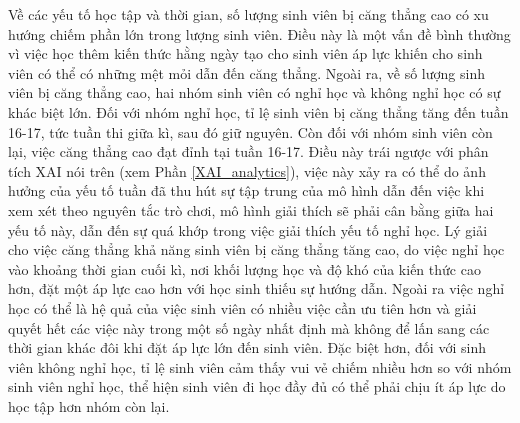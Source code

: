 Về các yếu tố học tập và thời gian, số lượng sinh viên bị căng thẳng cao có xu hướng chiếm phần lớn trong lượng sinh viên. Điều này là một vấn đề bình thường vì việc học thêm kiến thức hằng ngày tạo cho sinh viên áp lực khiến cho sinh viên có thể có những mệt mỏi dẫn đến căng thẳng. Ngoài ra, về số lượng sinh viên bị căng thẳng cao, hai nhóm sinh viên có nghỉ học và không nghỉ học có sự khác biệt lớn. Đối với nhóm nghỉ học, tỉ lệ sinh viên bị căng thẳng tăng đến tuần 16-17, tức tuần thi giữa kì, sau đó giữ nguyên. Còn đối với nhóm sinh viên còn lại, việc căng thẳng cao đạt đỉnh tại tuần 16-17. Điều này trái ngược với phân tích XAI nói trên (xem Phần \ref{XAI_analytics}), việc này xảy ra có thể do ảnh hưởng của yếu tố tuần đã thu hút sự tập trung của mô hình dẫn đến việc khi xem xét theo nguyên tắc trò chơi, mô hình giải thích sẽ phải cân bằng giữa hai yếu tố này, dẫn đến sự quá khớp trong việc giải thích yếu tố nghỉ học. Lý giải cho việc căng thẳng khả năng sinh viên bị căng thẳng tăng cao, do việc nghỉ học vào khoảng thời gian cuối kì, nơi khối lượng học và độ khó của kiến thức cao hơn, đặt một áp lực cao hơn với học sinh thiếu sự hướng dẫn. Ngoài ra việc nghỉ học có thể là hệ quả của việc sinh viên có nhiều việc cần ưu tiên hơn và giải quyết hết các việc này trong một số ngày nhất định mà không để lấn sang các thời gian khác đôi khi đặt áp lực lớn đến sinh viên. Đặc biệt hơn, đối với sinh viên không nghỉ học, tỉ lệ sinh viên cảm thấy vui vẻ chiếm nhiều hơn so với nhóm sinh viên nghỉ học, thể hiện sinh viên đi học đầy đủ có thể phải chịu ít áp lực do học tập hơn nhóm còn lại. 

